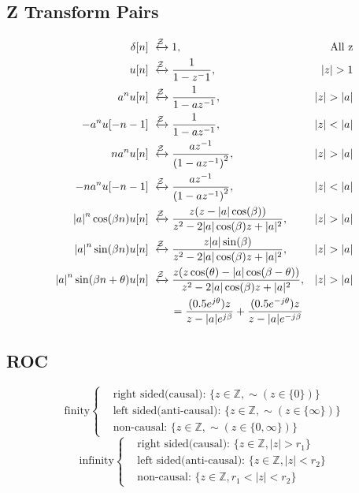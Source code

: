 \subsection{Z Transform Pairs}
\begin{align*}
    \delta [n] &\xleftrightarrow{\mathcal{Z}} 1, &\text{All z}\\
    u[n] &\xleftrightarrow{\mathcal{Z}} \frac{1}{{1 - z^-1}},&\left| z \right| > 1\\
    a^n u[n] &\xleftrightarrow{\mathcal{Z}} \frac{1}{1 - az^{-1}},&\left| z \right| > \left| a \right|\\
    -a^n u[-n-1] &\xleftrightarrow{\mathcal{Z}} \frac{1}{1 - az^{-1}},&\left| z \right| < \left| a \right|\\
    na^n u[n] &\xleftrightarrow{\mathcal{Z}} \frac{{az^{-1}}}{{\left( {1 - az^{-1}} \right)^2 }},&\left| z \right| > \left| a \right|\\
    -na^n u[-n-1] &\xleftrightarrow{\mathcal{Z}} \frac{{az^{-1}}}{{\left( {1 - az^{-1}} \right)^2 }},&\left| z \right| < \left| a \right|\\
    \left|a\right|^n\cos (\beta n)u[n] &\xleftrightarrow{\mathcal{Z}} \frac{z(z-\left|a\right|\cos (\beta))}{z^2-2|a|\cos(\beta)z+|a|^2}, &|z|>|a|\\
    \left|a\right|^n\sin (\beta n)u[n] &\xleftrightarrow{\mathcal{Z}} \frac{z|a|\sin(\beta)}{z^2-2|a|\cos(\beta)z+|a|^2}, &|z|>|a|\\
    \left|a\right|^n\sin (\beta n + \theta)u[n] &\xleftrightarrow{\mathcal{Z}} \frac{z(z\cos(\theta)-|a|\cos(\beta-\theta))}{z^2-2|a|\cos(\beta)z+|a|^2}, &|z|>|a|\\
    &\qquad=\frac{(0.5e^{j\theta})z}{z-|a|e^{j\beta}}+\frac{(0.5e^{-j\theta})z}{z-|a|e^{-j\beta}}
\end{align*}
\subsection{ROC}
\begin{equation*}
    \text{finity}
        \begin{cases}
            & \text{right sided(causal): } \{z \in \mathbb{Z}, \sim(z\in \{0\})\}\\
            & \text{left sided(anti-causal): } \{z\in \mathbb{Z}, \sim(z\in\{\infty\})\}\\
            & \text{non-causal: } \{z\in \mathbb{Z}, \sim(z\in\{0, \infty\})\}
        \end{cases}
\end{equation*}
\begin{equation*}
    \text{infinity}
        \begin{cases}
            & \text{right sided(causal): } \{z \in \mathbb{Z}, |z| > r_1\}\\
            & \text{left sided(anti-causal): } \{z \in \mathbb{Z}, |z| < r_2\}\\
            & \text{non-causal: } \{z \in \mathbb{Z}, r_1 < |z| < r_2\}
        \end{cases}
\end{equation*}